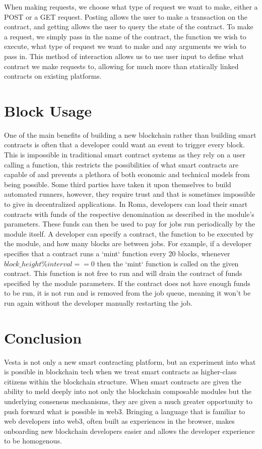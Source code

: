 \documentclass[a4paper]{article}
\begin{document}
When making requests, we choose what type of request we want to make, either a POST or a GET request.
Posting allows the user to make a transaction on the contract, and getting allows the user to query the state of the contract.
To make a request, we simply pass in the name of the contract, the function we wish to execute, what type of request we want to make and any arguments we wish to pass in.
This method of interaction allows us to use user input to define what contract we make requests to, allowing for much more than statically linked contracts on existing platforms.

\section{Block Usage}\label{sec:block-usage}
One of the main benefits of building a new blockchain rather than building smart contracts is often that a developer could want an event to trigger every block.
This is impossible in traditional smart contract systems as they rely on a user calling a function, this restricts the possibilities of what smart contracts are capable of and prevents a plethora of both economic and technical models from being possible.
Some third parties have taken it upon themselves to build automated runners, however, they require trust and that is sometimes impossible to give in decentralized applications.\cite{croncat}
In Roma, developers can load their smart contracts with funds of the respective denomination as described in the module's parameters.
These funds can then be used to pay for jobs run periodically by the module itself.
A developer can specify a contract, the function to be executed by the module, and how many blocks are between jobs.
For example, if a developer specifies that a contract runs a `mint` function every 20 blocks, whenever $block\_height \% interval == 0$ then the `mint` function is called on the given contract.
This function is not free to run and will drain the contract of funds specified by the module parameters.
If the contract does not have enough funds to be run, it is not run and is removed from the job queue, meaning it won't be run again without the developer manually restarting the job.

\section{Conclusion}\label{sec:conclusion}
Vesta is not only a new smart contracting platform, but an experiment into what is possible in blockchain tech when we treat smart contracts as higher-class citizens within the blockchain structure.
When smart contracts are given the ability to meld deeply into not only the blockchain composable modules but the underlying consensus mechanisms, they are given a much greater opportunity to push forward what is possible in web3.
Bringing a language that is familiar to web developers into web3, often built as experiences in the browser, makes onboarding new blockchain developers easier and allows the developer experience to be homogenous.

\newpage
\printbibliography
\end{document}
